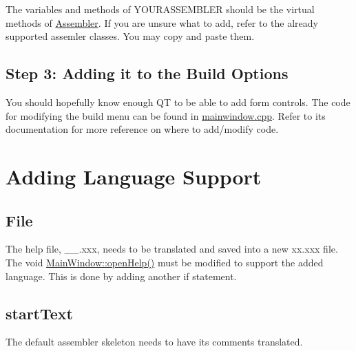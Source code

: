 The variables and methods of Y\+O\+U\+R\+A\+S\+S\+E\+M\+B\+L\+E\+R should be the virtual methods of \hyperlink{class_assembler}{Assembler}. If you are unsure what to add, refer to the already supported assemler classes. You may copy and paste them.\hypertarget{index_step3}{}\subsection{Step 3\+: Adding it to the Build Options}\label{index_step3}
You should hopefully know enough Q\+T to be able to add form controls. The code for modifying the build menu can be found in \hyperlink{mainwindow_8cpp}{mainwindow.\+cpp}. Refer to its documentation for more reference on where to add/modify code.\hypertarget{index_section3}{}\section{Adding Language Support}\label{index_section3}
\hypertarget{index_Help}{}\subsection{File}\label{index_Help}
The help file, \+\_\+\+\_\+.\+xxx, needs to be translated and saved into a new xx.\+xxx file. The void \hyperlink{class_main_window_a4037900bbe42daa151e96ba5c96c8f62}{Main\+Window\+::open\+Help()} must be modified to support the added language. This is done by adding another if statement.\hypertarget{index_startText}{}\subsection{start\+Text}\label{index_startText}
The default assembler skeleton needs to have its comments translated. 